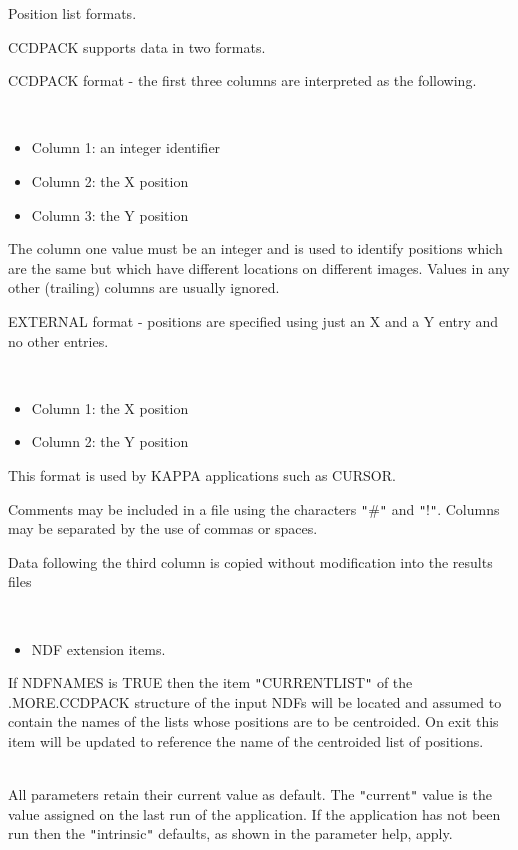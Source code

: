 \documentclass[twoside,11pt]{article}
\newcommand{\xref}[3]{#1}
\renewcommand{\_}{\texttt{\symbol{95}}}
\newcommand{\qt}[1]{{\tt "}#1{\tt "}}
\newcommand{\sstdiytopic}[2]{\item[#1:] \mbox{} \\[1.3ex] #2}
\newcommand{\sstitemlist}[1]{
  \mbox{} \\
  \vspace{-3.5ex}
  \begin{itemize}
     #1
  \end{itemize}
}
\newcommand{\sstitem}{\item}
\newcommand{\sstdiytopic}[2]{\item[{#1}] #2 }
\newcommand{\sstitemlist}[1]{
      \begin{itemize}
         #1
      \end{itemize}
      \\
   }
\newcommand{\sstitem}{\item}
\begin{document}
{{{         \sstitem
         Position list formats.

      }
        CCDPACK supports data in two formats.

        CCDPACK format - the first three columns are interpreted as the
        following.

      \sstitemlist{

         \sstitem
              Column 1: an integer identifier

         \sstitem
              Column 2: the X position

         \sstitem
              Column 3: the Y position

      }
        The column one value must be an integer and is used to identify
        positions which are the same but which have different locations
        on different images. Values in any other (trailing) columns are
        usually ignored.

        EXTERNAL format - positions are specified using just an X and
        a Y entry and no other entries.

      \sstitemlist{

         \sstitem
              Column 1: the X position

         \sstitem
              Column 2: the Y position

      }
        This format is used by KAPPA applications such as
        \xref{CURSOR}{sun95}{CURSOR}.

        Comments may be included in a file using the characters \qt{\#} and
        \qt{!}. Columns may be separated by the use of commas or spaces.

        Data following the third column is copied without modification
        into the results files

      \sstitemlist{

         \sstitem
         NDF extension items.

      }
        If NDFNAMES is TRUE then the item \qt{CURRENT\_LIST} of the
        .MORE.CCDPACK structure of the input NDFs will be located
        and assumed to contain the names of the lists whose positions
        are to be centroided. On exit this item will be updated to
        reference the name of the centroided list of positions.
   }
   \sstdiytopic{
      Behaviour of parameters
   } {
      All parameters retain their current value as default. The
      \qt{current} value is the value assigned on the last run of the
      application. If the application has not been run then the
      \qt{intrinsic} defaults, as shown in the parameter help, apply.

}}
\end{document}
